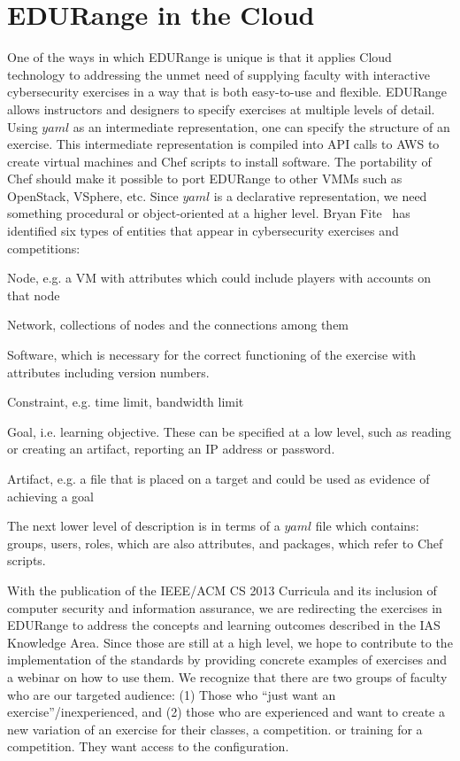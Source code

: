 \section*{EDURange in the Cloud}
One of the ways in which EDURange is unique is that it applies Cloud technology 
to addressing the unmet need of supplying faculty with interactive cybersecurity exercises 
in a way that is both easy-to-use and flexible.
EDURange allows instructors and designers to specify exercises at multiple levels of detail.
Using $yaml$ as an intermediate representation, one can specify the structure of an exercise.
This intermediate representation is compiled into API calls to AWS to create virtual machines and
Chef scripts to install software. The portability of Chef should make it possible to port EDURange to
other VMMs such as OpenStack, VSphere, etc.
Since $yaml$ is a declarative representation, 
we need something procedural or object-oriented  at a higher level.  Bryan Fite~\cite{fite_2013} has identified
six types of entities that appear in cybersecurity exercises and competitions:
\begin{packenum}
  \item Node, e.g.  a VM with attributes which  could include players with accounts on that node
  \item Network,  collections of nodes and the connections among them
  \item Software, which is necessary for the correct functioning of the exercise
    with attributes including version numbers.
  \item Constraint, e.g. time limit, bandwidth limit
  \item Goal, i.e. learning objective.  These can be specified at a low level, such as 
    reading or creating an artifact, reporting an IP address or password.
  \item Artifact, e.g. a file that is placed on a target and could be used as evidence of achieving a goal
\end{packenum}

The next lower level of description is in terms of a $yaml$ file which contains:
 groups, users, roles, which are also attributes, and packages, which refer to Chef scripts.


With the publication of the IEEE/ACM CS 2013 Curricula and its inclusion of computer security and 
information assurance, we are redirecting the exercises in EDURange to address the concepts and learning 
outcomes described in the IAS Knowledge Area.  Since those are still at a high level, we hope to contribute
to the implementation of the standards by providing concrete examples of exercises and a webinar
on how to use them.  We recognize that
there are two groups of faculty who are our targeted audience: (1) Those who ``just want an exercise''/inexperienced, 
and (2) those who are experienced and want to create a new variation of an exercise for
their classes, a competition.  or training for a competition.  They want access to the configuration.


